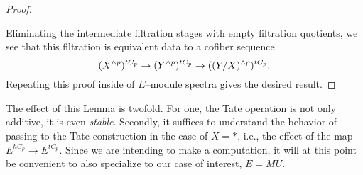 \begin{proof}
\begin{center}
\end{center}
Eliminating the intermediate filtration stages with empty filtration quotients, we see that this filtration is equivalent data to a cofiber sequence \[(X^{\wedge p})^{tC_p} \to (Y^{\wedge p})^{tC_p} \to ((Y/X)^{\wedge p})^{tC_p}.\]  Repeating this proof inside of \(E\)--module spectra gives the desired result.
\end{proof}

The effect of this Lemma is twofold.  For one, the Tate operation is not only additive, it is even \emph{stable}.  Secondly, it suffices to understand the behavior of passing to the Tate construction in the case of \(X = *\), i.e., the effect of the map \(E^{hC_p} \to E^{tC_p}\).  Since we are intending to make a computation, it will at this point be convenient to also specialize to our case of interest, \(E = MU\).

